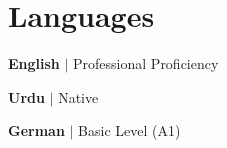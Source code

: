 
\section{Languages}
\resumeSubHeadingListStart
\small{
\item{\textbf{English} $|$ Professional Proficiency}
\item{\textbf{Urdu} $|$ Native}
\item{\textbf{German} $|$ Basic Level (A1)}
}
\resumeSubHeadingListEnd

